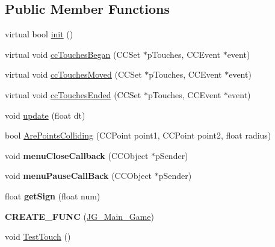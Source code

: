 \subsection*{Public Member Functions}
\begin{DoxyCompactItemize}
\item 
virtual bool \hyperlink{class_j_g___main___game_a9022437f7d1240ef8991b0e6c19e08ec}{init} ()
\item 
virtual void \hyperlink{class_j_g___main___game_ab4c6f1d5f85c480f1f6cd357a66cfd55}{cc\-Touches\-Began} (C\-C\-Set $\ast$p\-Touches, C\-C\-Event $\ast$event)
\item 
virtual void \hyperlink{class_j_g___main___game_a1a99f1b88de06e8882925c744be3cb91}{cc\-Touches\-Moved} (C\-C\-Set $\ast$p\-Touches, C\-C\-Event $\ast$event)
\item 
virtual void \hyperlink{class_j_g___main___game_ab9f945eff20cd58d54742828519bb6c7}{cc\-Touches\-Ended} (C\-C\-Set $\ast$p\-Touches, C\-C\-Event $\ast$event)
\item 
void \hyperlink{class_j_g___main___game_a1438760d9db28d5410b5fac68a70aa77}{update} (float dt)
\item 
bool \hyperlink{class_j_g___main___game_a92d55b1498b07adf8f83e67f71b1c7d0}{Are\-Points\-Colliding} (C\-C\-Point point1, C\-C\-Point point2, float radius)
\item 
\hypertarget{class_j_g___main___game_ae3825c2f0b5ead18bf4a7b5c8632ac9f}{void {\bfseries menu\-Close\-Callback} (C\-C\-Object $\ast$p\-Sender)}\label{class_j_g___main___game_ae3825c2f0b5ead18bf4a7b5c8632ac9f}

\item 
\hypertarget{class_j_g___main___game_af2739df486e18c008097b3e070c91ec0}{void {\bfseries menu\-Pause\-Call\-Back} (C\-C\-Object $\ast$p\-Sender)}\label{class_j_g___main___game_af2739df486e18c008097b3e070c91ec0}

\item 
\hypertarget{class_j_g___main___game_a702c39bc1dd589208b2ca832e77d5d82}{float {\bfseries get\-Sign} (float num)}\label{class_j_g___main___game_a702c39bc1dd589208b2ca832e77d5d82}

\item 
\hypertarget{class_j_g___main___game_ab9b82a7809e11b3ec224e53e06882779}{{\bfseries C\-R\-E\-A\-T\-E\-\_\-\-F\-U\-N\-C} (\hyperlink{class_j_g___main___game}{J\-G\-\_\-\-Main\-\_\-\-Game})}\label{class_j_g___main___game_ab9b82a7809e11b3ec224e53e06882779}

\item 
void \hyperlink{class_j_g___main___game_a270e423f2d88ef6c8b7151e4305f8bb5}{Test\-Touch} ()
\end{DoxyCompactItemize}
